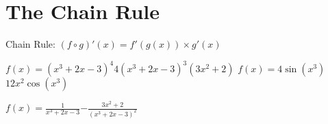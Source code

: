 \section{The Chain Rule}


\begin{myframe}[arc=10pt,auto outer arc]
	\centering Chain Rule: $\displaystyle (f\circ g)'(x) = f'(g(x)) \times g'(x)$
\end{myframe}

\pairofprobsans%
{$\displaystyle f\left(x\right) = (x^3 + 2x - 3)^4$}{$\displaystyle 4(x^3 + 2x - 3)^{3}(3x^2 + 2)$}%
{$\displaystyle f\left(x\right) = 4{\sin{(x^3)}}$}{$\displaystyle 12x^2 \cos{(x^3)}$}

\problemans%
{$\displaystyle f\left(x\right) = \frac{1}{x^3 + 2x - 3}$}{$\displaystyle -\frac{3x^2 + 2}{(x^3 + 2x - 3)^2}$}%

